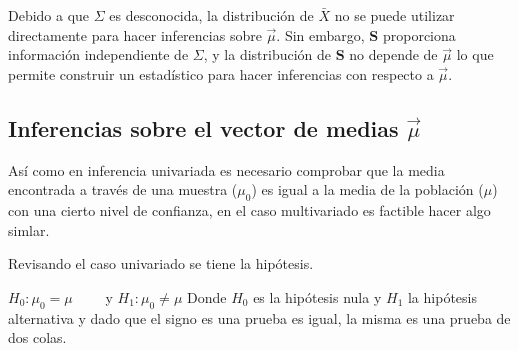 \documentclass[english]{report}
\begin{document}
Debido a que $\Sigma$ es desconocida, la distribución de $\bar{X}$ no se puede utilizar directamente para hacer inferencias sobre $\vec{\mu}$. Sin embargo, $\textbf{S}$ proporciona información independiente de $\Sigma$, y la distribución de $\textbf{S}$ no depende de $\vec{\mu}$ lo que permite construir un estadístico para hacer inferencias con respecto a $\vec{\mu}$.


\subsection{Inferencias sobre el vector de medias $\vec{\mu}$}
Así como en inferencia univariada es necesario comprobar que la media encontrada a través de una muestra ($\mu_0$) es igual a la media de la población ($\mu$) con una cierto nivel de confianza, en el caso multivariado es factible hacer algo simlar.

Revisando el caso univariado se tiene la hipótesis.
 
\vspace{5pt}
$H_0:\mu_0 = \mu \qquad$ y $H_1:\mu_0 \neq \mu$
\vspace{5pt}
Donde $H_0$ es la hipótesis nula y $H_1$ la hipótesis alternativa y dado que el signo es una prueba es igual, la misma es una prueba de dos colas.
\end{document}
